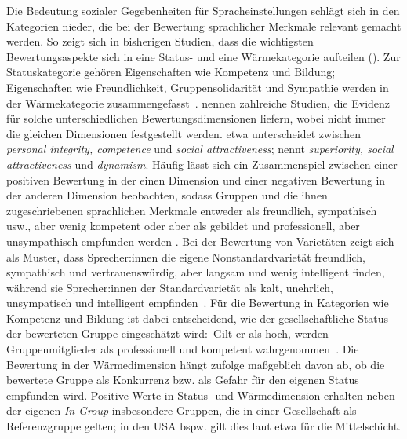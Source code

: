 Die Bedeutung sozialer Gegebenheiten für Spracheinstellungen schlägt sich in den Kategorien nieder, die bei der Bewertung sprachlicher Merkmale relevant gemacht werden.  
So zeigt sich in bisherigen Studien, dass die wichtigsten Bewertungsaspekte sich in eine Status- und eine Wärmekategorie aufteilen (\cites[s.][155]{Creber.1983}[49]{Preston2004}{Fiske.2002}). 
Zur Statuskategorie gehören Eigenschaften wie Kompetenz und Bildung;  
Eigenschaften wie Freundlichkeit, Gruppensolidarität und Sympathie werden in der Wärmekategorie zusammengefasst~\citep[s.][182]{Plewnia.2011}.
\citet[223--224]{Cargile.1994} nennen zahlreiche Studien, die Evidenz f{\"u}r solche unterschiedlichen Bewertungsdimensionen liefern, wobei nicht immer die gleichen Dimensionen festgestellt werden. \citet{Lambert.1967} etwa unterscheidet zwischen \textit{personal integrity, competence} und \textit{social attractiveness}; 
\citet[117]{Garrett.2007} nennt \textit{superiority, social attractiveness} und \textit{dynamism}. 
Häufig lässt sich ein Zusammenspiel zwischen einer positiven Bewertung in der einen Dimension und einer negativen Bewertung in der anderen Dimension beobachten, sodass Gruppen und die ihnen zugeschriebenen sprachlichen Merkmale entweder als freundlich, sympathisch usw., aber wenig kompetent oder aber als gebildet und professionell, aber unsympathisch empfunden werden \citep[s.][878--879]{Fiske.2002}.
Bei der Bewertung von Variet{\"a}ten zeigt sich als Muster, dass Sprecher:innen die eigene  Nonstandardvariet{\"a}t freundlich, sympathisch und vertrauensw{\"u}rdig, aber langsam und wenig intelligent finden, w{\"a}hrend sie Sprecher:innen der Standardvarietät als kalt, unehrlich, unsympatisch und intelligent empfinden~\citep[s.][1687]{Preston2005}.
F{\"u}r die Bewertung in Kategorien wie Kompetenz und Bildung ist dabei entscheidend, wie der gesellschaftliche Status der bewerteten Gruppe eingesch{\"a}tzt wird:~Gilt er als hoch, werden Gruppenmitglieder als professionell und kompetent wahrgenommen~\citep[897]{Fiske.2002}.
Die Bewertung in der Wärmedimension hängt \citet[897]{Fiske.2002} zufolge maßgeblich davon ab, ob die bewertete Gruppe als Konkurrenz bzw. als Gefahr für den eigenen Status empfunden wird.
Positive Werte in Status- und Wärmedimension erhalten neben der eigenen \textit{In-Group} insbesondere Gruppen, die in einer Gesellschaft als Referenzgruppe gelten; in den USA bspw. gilt dies laut \citet[898]{Fiske.2002} etwa für die Mittelschicht.

